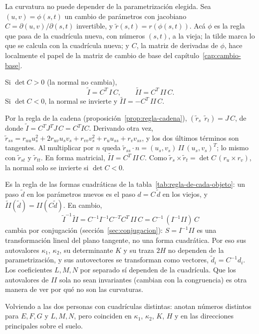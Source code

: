 La curvatura no puede depender de la parametrización elegida. Sea \((u,v)=\phi(s,t)\) un cambio de parámetros con jacobiano
\(C=\partial(u,v)/\partial(s,t)\) invertible, y \(\tilde r(s,t)=r(\phi(s,t))\).
Acá \(\phi\) es la regla que pasa de la cuadrícula nueva, con números \((s,t)\), a la vieja; la
tilde marca lo que se calcula con la cuadrícula nueva; y \(C\), la matriz de derivadas de
\(\phi\), hace localmente el papel de la matriz de cambio de base del
capítulo~\ref{cap:cambio-base}.

\begin{proposicion}\label{prop:II-congruencia}
Si \(\det C>0\) (la normal no cambia),
\[
  \tilde I=C^T\,I\,C,\qquad \tilde{II}=C^T\,II\,C .
\]
Si \(\det C<0\), la normal se invierte y \(\tilde{II}=-C^T\,II\,C\).
\end{proposicion}

\begin{demostracion}
Por la regla de la cadena (proposición~\ref{prop:regla-cadena}),
\((\tilde r_s\ \ \tilde r_t)=J\,C\), de donde \(\tilde I=C^TJ^TJ\,C=C^TIC\). Derivando otra vez,
\(\tilde r_{ss}=r_{uu}u_s^2+2r_{uv}u_sv_s+r_{vv}v_s^2+r_uu_{ss}+r_vv_{ss}\), y los dos últimos
términos son tangentes. Al multiplicar por \(n\) queda
\(\tilde r_{ss}\cdot n=(u_s,v_s)\,II\,(u_s,v_s)^T\); lo mismo con \(\tilde r_{st}\) y
\(\tilde r_{tt}\). En forma matricial, \(\tilde{II}=C^T\,II\,C\). Como
\(\tilde r_s\times\tilde r_t=\det C\,(r_u\times r_v)\), la normal solo se invierte si
\(\det C<0\).
\end{demostracion}

Es la regla de las formas cuadráticas de la tabla~\ref{tab:regla-de-cada-objeto}: un paso
\(\tilde d\) en los parámetros nuevos es el paso \(d=C\,\tilde d\) en los viejos, y
\(\tilde{II}(\tilde d)=II(C\tilde d)\). En cambio,
\[
  \tilde I^{-1}\tilde{II}=C^{-1}I^{-1}C^{-T}C^T\,II\,C=C^{-1}\,(I^{-1}II)\,C
\]
cambia por conjugación (sección~\ref{sec:conjugacion}): \(S=I^{-1}II\) es una transformación
lineal del plano tangente, no una forma cuadrática. Por eso sus autovalores \(\kappa_1\),
\(\kappa_2\), su determinante \(K\) y su traza \(2H\) no dependen de la parametrización, y sus
autovectores se transforman como vectores, \(\tilde d_i=C^{-1}d_i\). Los coeficientes \(L,M,N\)
por separado sí dependen de la cuadrícula. Que los autovalores de \(II\) sola no sean invariantes
(cambian con la congruencia) es otra manera de ver por qué no son las curvaturas.

Volviendo a las dos personas con cuadrículas distintas: anotan números distintos para \(E,F,G\)
y \(L,M,N\), pero coinciden en \(\kappa_1\), \(\kappa_2\), \(K\), \(H\) y en las direcciones
principales sobre el suelo.

